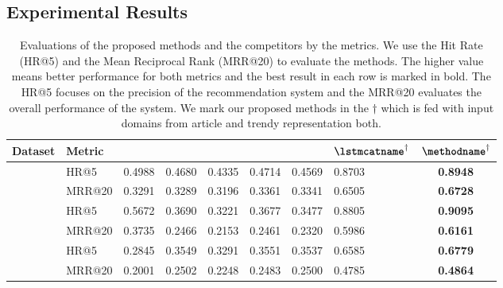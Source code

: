 \subsection{Experimental Results}
\label{sec:exp:results}
\begin{table*}[t]
	\renewcommand{\arraystretch}{1.2}
	\caption{
		Evaluations of the proposed methods and the competitors by the metrics. We use the Hit Rate (HR@5) and the Mean Reciprocal Rank (MRR@20) to evaluate the methods.
		The higher value means better performance for both metrics and the best result in each row is marked in bold.
		The HR@5 focuses on the precision of the recommendation system and the MRR@20 evaluates the overall performance of the system.
		We mark our proposed methods in the $\dagger$ which is fed with input domains from article and trendy representation both.
	}
	\label{tab:evaluation}
	\begin{tabular}{llC{1.4cm}C{1.4cm}C{1.4cm}C{1.3cm}C{1.3cm}C{1.6cm}c}
\toprule
		\textbf{Dataset} & \textbf{Metric} & \textbf{\compPopName} & \textbf{\compLSTMName} & \textbf{\compGruRecName} & \textbf{\compNaverName} & \textbf{\compYahooName} & $\textbf{\lstmcatname}^\dagger$ & $\textbf{\methodname}^\dagger$ \\
\midrule
{} \
	& HR@5   & 0.4988 & 0.4680 & 0.4335 & 0.4714 & 0.4569 & 0.8703 & \textbf{0.8948} \\
	& MRR@20 & 0.3291 & 0.3289 & 0.3196 & 0.3361 & 0.3341 & 0.6505 & \textbf{0.6728} \\
\cmidrule(lr){2-9}
 \
	& HR@5   & 0.5672 & 0.3690 & 0.3221 & 0.3677 & 0.3477 & 0.8805 & \textbf{0.9095} \\
	& MRR@20 & 0.3735 & 0.2466 & 0.2153 & 0.2461 & 0.2320 & 0.5986 & \textbf{0.6161} \\
\cmidrule(lr){2-9}
\multirow{2}{*}{\dataGloboName} \
	& HR@5   & 0.2845 & 0.3549 & 0.3291 & 0.3551 & 0.3537 & 0.6585 & \textbf{0.6779} \\
	& MRR@20 & 0.2001 & 0.2502 & 0.2248 & 0.2483 & 0.2500 & 0.4785 & \textbf{0.4864} \\
\bottomrule
\end{tabular}
\end{table*}

